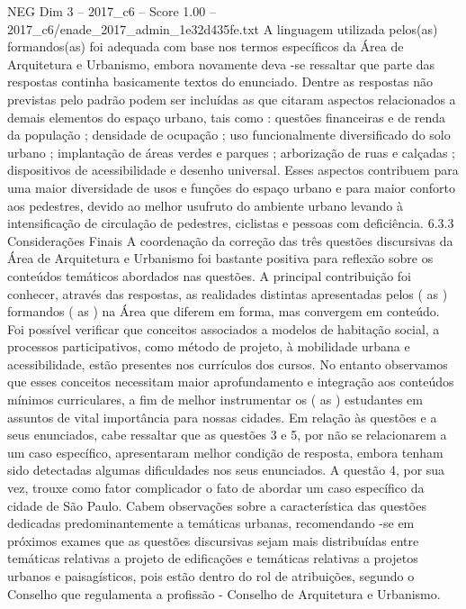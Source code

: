 \begin{textsample}{NEG Dim 3 – 2017\_c6 – Score 1.00 – 2017\_c6/enade\_2017\_admin\_1e32d435fe.txt}
A linguagem utilizada pelos(as) formandos(as) foi adequada com base nos termos específicos da Área de Arquitetura e Urbanismo, embora novamente deva -se ressaltar que parte das respostas continha basicamente textos do enunciado.
Dentre as respostas não previstas pelo padrão podem ser incluídas as que citaram aspectos relacionados a demais elementos do espaço urbano, tais como : questões financeiras e de renda da população ; densidade de ocupação ; uso funcionalmente diversificado do solo urbano ; implantação de áreas verdes e parques ; arborização de ruas e calçadas ; dispositivos de acessibilidade e desenho universal.
Esses aspectos contribuem para uma maior diversidade de usos e funções do espaço urbano e para maior conforto aos pedestres, devido ao melhor usufruto do ambiente urbano levando à intensificação de circulação de pedestres, ciclistas e pessoas com deficiência. 6.3.3 Considerações Finais A coordenação da correção das três questões discursivas da Área de Arquitetura e Urbanismo foi bastante positiva para reflexão sobre os conteúdos temáticos abordados nas questões.
A principal contribuição foi conhecer, através das respostas, as realidades distintas apresentadas pelos ( as ) formandos ( as ) na Área que diferem em forma, mas convergem em conteúdo.
Foi possível verificar que conceitos associados a modelos de habitação social, a processos participativos, como método de projeto, à mobilidade urbana e acessibilidade, estão presentes nos currículos dos cursos.
No entanto observamos que esses conceitos necessitam maior aprofundamento e integração aos conteúdos mínimos curriculares, a fim de melhor instrumentar os ( as ) estudantes em assuntos de vital importância para nossas cidades.
Em relação às questões e a seus enunciados, cabe ressaltar que as questões 3 e 5, por não se relacionarem a um caso específico, apresentaram melhor condição de resposta, embora tenham sido detectadas algumas dificuldades nos seus enunciados.
A questão 4, por sua vez, trouxe como fator complicador o fato de abordar um caso específico da cidade de São Paulo.
Cabem observações sobre a característica das questões dedicadas predominantemente a temáticas urbanas, recomendando -se em próximos exames que as questões discursivas sejam mais distribuídas entre temáticas relativas a projeto de edificações e temáticas relativas a projetos urbanos e paisagísticos, pois estão dentro do rol de atribuições, segundo o Conselho que regulamenta a profissão - Conselho de Arquitetura e Urbanismo.

\end{textsample}
